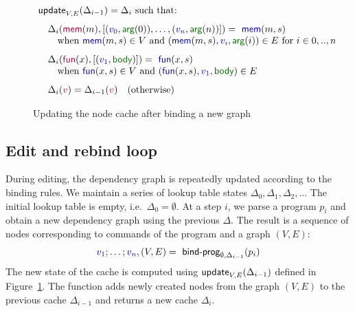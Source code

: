 \documentclass[english,crc]{programming}
\theoremstyle{plain}
\theoremstyle{definition}
\newcommand{\ident}[1]{\textnormal{\textcolor{idclr}{\sffamily #1}}}
\newcommand{\bndclr}[1]{\textcolor{kvdclr}{#1}}
\newcommand{\bkndclr}[1]{\textcolor{prepclr}{#1}}
\newcommand{\bnd}[1]{\textnormal{\textcolor{kvdclr}{\sffamily #1}}}
\newcommand{\bknd}[1]{\textnormal{\textcolor{prepclr}{\sffamily #1}}}
\newcommand{\blbl}[1]{\textnormal{\textcolor{numclr}{\sffamily #1}}}
\begin{document}

\begin{figure}
\vspace{-0.5em}
\begin{equation*}
\begin{array}{l}
\ident{update}_{V,E}(\Delta_{i-1}) = \Delta_i~\textnormal{such that:}
\\[0.75em]
\quad\Delta_{i}(\bknd{mem}(m), [(\bndclr{v_0},\blbl{arg}(0)),\ldots, (\bndclr{v_n},\blbl{arg}(n))]) = \bnd{mem}(m, s)\\
\quad\quad \textnormal{when}~\bnd{mem}(m, s) \in V
~\textnormal{and}~(\bnd{mem}(m, s), \bndclr{v_i}, \blbl{arg}(i)) \in E~\textnormal{for}~i\in 0,..,n
\\[0.75em]
\quad\Delta_{i}(\bknd{fun}(x), [(\bndclr{v_1},\blbl{body})]) = \bnd{fun}(x, s)\\
\quad\quad \textnormal{when}~\bnd{fun}(x, s) \in V
~\textnormal{and}~(\bnd{fun}(x, s), \bndclr{v_1}, \blbl{body}) \in E
\\[0.75em]
\quad\Delta_{i}(\bkndclr{v}) = \Delta_{i-1}(\bkndclr{v})\quad \textnormal{(otherwise)}
\end{array}
\end{equation*}
\vspace{-0.5em}
\caption{Updating the node cache after binding a new graph}
\label{fig:loop}
\vspace{-0.5em}
\end{figure}


\subsection{Edit and rebind loop}

During editing, the dependency graph is repeatedly updated according to the binding rules.
We maintain a series of lookup table states $\Delta_0, \Delta_1, \Delta_2, \ldots$ The initial
lookup table is empty, i.e.~$\Delta_0 = \emptyset$. At a step $i$, we parse a program $p_i$
and obtain a new dependency graph using the previous $\Delta$. The result is
a sequence of nodes corresponding to commands of the program and a graph $(V, E)$:
%
\begin{equation*}
\bndclr{v_1}; \ldots; \bndclr{v_n}, (V, E) = \ident{bind-prog}_{\emptyset, \Delta_{i-1}}(p_i)
\end{equation*}
%
The new state of the cache is computed using $\ident{update}_{V, E}(\Delta_{i-1})$
defined in Figure~\ref{fig:loop}. The function adds newly created nodes from the graph
$(V, E)$ to the previous cache $\Delta_{i-1}$ and returns a new cache $\Delta_{i}$.
\end{document}
